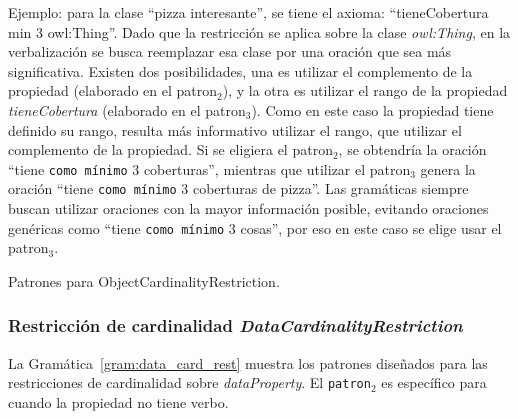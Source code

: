 Ejemplo: para la clase ``pizza interesante'', se tiene el axioma: ``tieneCobertura min 3 owl:Thing''. Dado que la restricción se aplica sobre la clase \emph{owl:Thing}, en la verbalización se busca reemplazar esa clase por una oración que sea más significativa. Existen dos posibilidades, una es utilizar el complemento de la propiedad (elaborado en el patron$_2$), y la otra es utilizar el rango de la propiedad \emph{tieneCobertura} (elaborado en el patron$_3$). Como en este caso la propiedad tiene definido su rango, resulta más informativo utilizar el rango, que utilizar el complemento de la propiedad. Si se eligiera el patron$_2$, se obtendría la oración ``tiene \texttt{como mínimo} 3 coberturas'', mientras que utilizar el patron$_3$ genera la oración ``tiene \texttt{como mínimo} 3 coberturas de pizza''. Las gramáticas siempre buscan utilizar oraciones con la mayor información posible, evitando oraciones genéricas como ``tiene \texttt{como mínimo} 3 cosas'', por eso en este caso se elige usar el patron$_3$.

\begin{GrammarEnv}
\begin{grammar}
\end{grammar}
\caption{Patrones para ObjectCardinalityRestriction.}\label{gram:object_card_rest}
\end{GrammarEnv}

\subsubsection{Restricción de cardinalidad \emph{DataCardinalityRestriction}}
La Gramática~\ref{gram:data_card_rest} muestra los patrones diseñados para las restricciones de cardinalidad sobre \emph{dataProperty}. El {\tt patron$_2$} es específico para cuando la propiedad no tiene verbo. 

